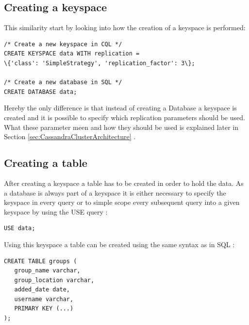 \subsection {Creating a keyspace}
This similarity start by looking into how the creation of a keyspace is performed:
\begin{verbatim}
/* Create a new keyspace in CQL */
CREATE KEYSPACE data WITH replication =
\{'class': 'SimpleStrategy', 'replication_factor': 3\};

/* Create a new database in SQL */
CREATE DATABASE data;
\end{verbatim}
Hereby the only difference is that instead of creating a Database a keyspace is created and it is possible to specify which replication parameters should be used. What these parameter meen and how they should be used is explained later in Section \ref{sec:CassandraClusterArchitecture} \autocite{cqlAlexMeng}.

\subsection{Creating a table}
After creating a keyspace a table has to be created in order to hold the data. As a database is always part of a keyspace it is either necessary to specify the keyspace in every query or to simple scope every subsequent query into a given keyspace by using the USE query \autocite{cassandra3cqldocUse}:
\begin{verbatim}
USE data;
\end{verbatim}

Using this keyspace a table can be created using the same syntax as in SQL \autocite{cqlAlexMeng, newInCQL3, cassandra3cqldocCreateTable}:
\begin{verbatim}
CREATE TABLE groups (
   group_name varchar,
   group_location varchar,
   added_date date,
   username varchar,
   PRIMARY KEY (...)
);
\end{verbatim}

